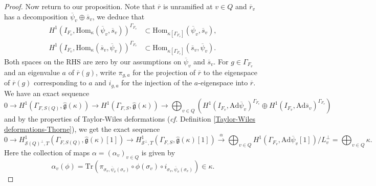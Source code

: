 \documentclass[12pt,oneside,reqno]{amsart}
\theoremstyle{plain}
\begin{document}
\begin{proof}
		Now return to our proposition.
		Note that $\overline{r}$ is unramified at $v\in Q$
		and
		$\overline{r}_v$ has a decomposition
		$\overline{\psi}_v\oplus\overline{s}_v$,
		we deduce that
		\begin{align*}
			H^1(I_{F_v},
			\mathrm{Hom}_\kappa
			(\overline{\psi}_v,\overline{s}_v))^{\Gamma_{F_v}}
			&
			\subset
			\mathrm{Hom}_{\kappa[\Gamma_{F_v}]}
			(\overline{\psi}_v,\overline{s}_v),
			\\
			H^1(I_{F_v},
			\mathrm{Hom}_\kappa
			(\overline{s}_v,\overline{\psi}_v))^{\Gamma_{F_v}}
			&
			\subset
			\mathrm{Hom}_{\kappa[\Gamma_{F_v}]}
			(\overline{s}_v,\overline{\psi}_v).
		\end{align*}
		Both spaces on the RHS are zero by our assumptions on $\overline{\psi}_v$ and $\overline{s}_v$.
		For $g\in\Gamma_{F_v}$
		and an eigenvalue $a$ of $\overline{r}(g)$,
		write
		$\pi_{g,a}$
		for the projection of
		$\overline{r}$
		to the eigenspace of $\overline{r}(g)$
		corresponding to $a$ and
		$i_{g,a}$
		for the injection of the
		$a$-eigenspace into $\overline{r}$.
		We have an exact sequence
		\[
		0
		\rightarrow
		H^1
		(\Gamma_{F,S(Q)},
		\widehat{\mathfrak{g}}(\kappa)
		)
		\rightarrow
		H^1
		(\Gamma_{F,S},
		\widehat{\mathfrak{g}}(\kappa)
		)
		\rightarrow
		\bigoplus_{v\in Q}
		\left(
		H^1(I_{F_v},
		\mathrm{Ad}\overline{\psi}_v)^{\Gamma_{F_v}}
		\oplus
		H^1(I_{F_v},
		\mathrm{Ad}\overline{s}_v)^{\Gamma_{F_v}}
		\right)
		\]
		and by the properties of
		Taylor-Wiles deformations
		(\emph{cf.}
		Definition \ref{Taylor-Wiles deformations-Thorne}),
		we get
		the exact sequence
		\[
		0
		\rightarrow
		H^1_{\mathcal{S}(Q)^\perp,T}
		\left(
		\Gamma_{F,S(Q)},
		\widehat{\mathfrak{g}}(\kappa)[1]
		\right)
		\rightarrow
		H^1_{\mathcal{S}^\perp,T}
		\left(
		\Gamma_{F,S},
		\widehat{\mathfrak{g}}(\kappa)[1]
		\right)
		\xrightarrow{\alpha}
		\bigoplus_{v\in Q}
		H^1
		\left(
		\Gamma_{F_v},
		\mathrm{Ad}\overline{\psi}_v[1]
		\right)
		/L_v^\perp
		=
		\bigoplus_{v\in Q}\kappa.
		\]
		Here
		the collection of maps
		$\alpha=(\alpha_v)_{v\in Q}$
		is given by
		\[
		\alpha_v(\phi)
		=
		\mathrm{Tr}
		\left(
		\pi_{\sigma_v,\overline{\psi}_v(\sigma_v)}
		\circ
		\phi(\sigma_v)
		\circ
		i_{\sigma_v,\overline{\psi}_v(\sigma_v)}
		\right)	
		\in
		\kappa.
		\]
		
		
		
		
		

\end{proof}
\end{document}
